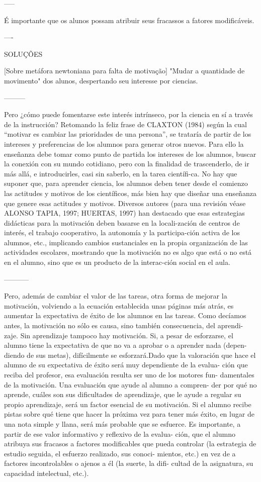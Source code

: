 -----

É importante que os alunos possam atribuir seus fracassos a fatores modificáveis.

----

SOLUÇÕES

[Sobre metáfora newtoniana para falta de motivação] "Mudar a quantidade de movimento" dos alunos, despertando seu interesse por ciencias.

---------

Pero ¿cómo puede fomentarse este interés intrínseco, por la ciencia en sí a través de la instrucción? Retomando la feliz frase de CLAXTON (1984) según la cual “motivar es cambiar las prioridades de una persona”, se trataría de partir de los intereses y preferencias de los alumnos para generar otros nuevos. Para ello la enseñanza debe tomar como punto de partida los intereses de los alumnos, buscar la conexión con su mundo cotidiano, pero con la finalidad de trascenderlo, de ir más allá, e introducirles, casi sin saberlo, en la tarea científi-ca. No hay que suponer que, para aprender ciencia, los alumnos deben tener desde el comienzo las actitudes y motivos de los científicos, más bien hay que diseñar una enseñanza que genere esas actitudes y motivos. Diversos autores (para una revisión véase ALONSO TAPIA, 1997; HUERTAS, 1997) han destacado que esas estrategias didácticas para la motivación deben basarse en la locali-zación de centros de interés, el trabajo cooperativo, la autonomía y la participa-ción activa de los alumnos, etc., implicando cambios sustanciales en la propia organización de las actividades escolares, mostrando que la motivación no es algo que está o no está en el alumno, sino que es un producto de la interac-ción social en el aula.

-----------

Pero, además de cambiar el valor de las tareas, otra forma de mejorar la motivación, volviendo a la ecuación establecida unas páginas más atrás, es aumentar la expectativa de éxito de los alumnos en las tareas. Como decíamos antes, la motivación no sólo es causa, sino también consecuencia, del aprendi- zaje. Sin aprendizaje tampoco hay motivación. Si, a pesar de esforzarse, el alumno tiene la expectativa de que no va a aprobar o a aprender nada (depen- diendo de sus metas), difícilmente se esforzará.Dado que la valoración que hace el alumno de su expectativa de éxito será muy dependiente de la evalua- ción que reciba del profesor, esa evaluación resulta ser uno de los motores fun- damentales de la motivación. Una evaluación que ayude al alumno a compren- der por qué no aprende, cuáles son sus dificultades de aprendizaje, que le ayude a regular su propio aprendizaje, será un factor esencial de su motivación. Si el alumno recibe pistas sobre qué tiene que hacer la próxima vez para tener más éxito, en lugar de una nota simple y llana, será más probable que se esfuerce. Es importante, a partir de ese valor informativo y reflexivo de la evalua- ción, que el alumno atribuya sus fracasos a factores modificables que pueda controlar (la estrategia de estudio seguida, el esfuerzo realizado, sus conoci- mientos, etc.) en vez de a factores incontrolables o ajenos a él (la suerte, la difi- cultad de la asignatura, su capacidad intelectual, etc.).

